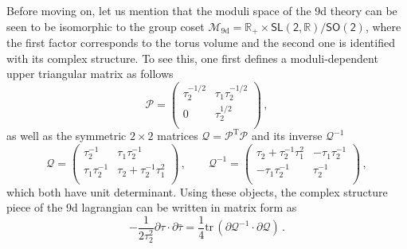 Before moving on, let us mention that the moduli space of the 9d theory can be seen to be isomorphic to the group coset $\mathcal{M}_{\text{9d}}=\mathbb{R}_+ \times \mathsf{SL(2, \mathbb{R})}/\mathsf{SO(2)}$, where the first factor corresponds to the torus volume and the second one is identified with its complex structure. To see this, one first defines a moduli-dependent upper triangular matrix as follows
%
\begin{equation}\label{eq:Pmatrix}
	\mathcal{P} = \left( \begin{array}{cc}
		\tau_2^{-1/2} & \tau_1 \tau_2^{-1/2} \\
		0 & \tau_2^{1/2}  \\
	\end{array}
	\right) \, ,
\end{equation}
%
as well as the symmetric $2\times 2$ matrices $\mathcal{Q} = \mathcal{P}^{\text{T}} \mathcal{P}$ and its inverse $\mathcal{Q}^{-1}$
%
\begin{equation}
	\mathcal{Q} = \left( \begin{array}{cc}
		\tau_2^{-1} & \tau_1 \tau_2^{-1} \\
		\tau_1 \tau_2^{-1} & \tau_2 + \tau_2^{-1} \tau_1^2  \\
	\end{array}
	\right) \, , \qquad 
   \mathcal{Q}^{-1} = \left( \begin{array}{cc}
		 \tau_2 + \tau_2^{-1} \tau_1^2 & -\tau_1 \tau_2^{-1} \\
		-\tau_1 \tau_2^{-1} & \tau_2^{-1}  \\
	\end{array} \right)\, ,
\end{equation}
%
which both have unit determinant. Using these objects, the complex structure piece of the 9d lagrangian can be written in matrix form as
%
\begin{equation}\label{eq:sl2matrixform}
	-\frac{1}{2 \tau_2^2} \partial \tau \cdot \partial \bar \tau= \frac{1}{4} \text{tr}\, \left( \partial\mathcal{Q}^{-1} \cdot \partial \mathcal{Q} \right)\, .
\end{equation}
%
